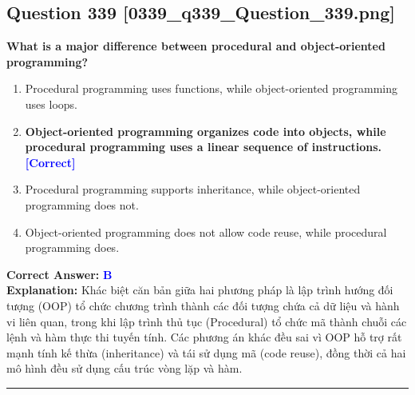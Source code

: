 \documentclass[11pt,a4paper]{article}
\begin{document}
\begin{minipage}{\textwidth}
\subsection*{Question 339 \quad \footnotesize{[0339\_q339\_Question\_339.png]}}
\noindent \textbf{What is a major difference between procedural and object-oriented programming?}

\begin{enumerate}[label=\Alph*.]
    \item Procedural programming uses functions, while object-oriented programming uses loops.
    \item \textbf{Object-oriented programming organizes code into objects, while procedural programming uses a linear sequence of instructions.} \hfill \textcolor{blue}{\textbf{[Correct]}}
    \item Procedural programming supports inheritance, while object-oriented programming does not.
    \item Object-oriented programming does not allow code reuse, while procedural programming does.
\end{enumerate}

\noindent \textbf{Correct Answer:} \textcolor{blue}{\textbf{B}} \\[2pt]
\noindent \textbf{Explanation:} Khác biệt căn bản giữa hai phương pháp là lập trình hướng đối tượng (OOP) tổ chức chương trình thành các đối tượng chứa cả dữ liệu và hành vi liên quan, trong khi lập trình thủ tục (Procedural) tổ chức mã thành chuỗi các lệnh và hàm thực thi tuyến tính. Các phương án khác đều sai vì OOP hỗ trợ rất mạnh tính kế thừa (inheritance) và tái sử dụng mã (code reuse), đồng thời cả hai mô hình đều sử dụng cấu trúc vòng lặp và hàm.

\par\vspace{0.3cm}
\hrule
\vspace{0.3cm}
\end{minipage}
\end{document}
